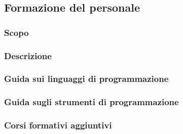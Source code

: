 \subsection{Formazione del personale}

\subsubsection{Scopo}

		\subsubsection{Descrizione}

		\subsubsection{Guida sui linguaggi di programmazione}
			
		\subsubsection{Guida sugli strumenti di programmazione}
			
		\subsubsection{Corsi formativi aggiuntivi}